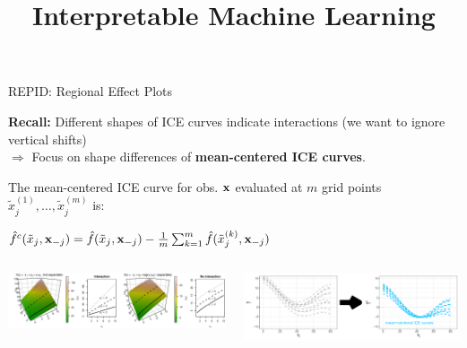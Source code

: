 \documentclass[11pt,compress,t,notes=noshow, aspectratio=169, xcolor=table]{beamer}
\title{Interpretable Machine Learning}
\date{}
\begin{document}
\newcommand{\titlefigure}{figure/ale_plot.pdf}
\newcommand{\learninggoals}{
\item Difference between feature effects and feature interactions
\item REPID
\item GADGET
}


\begin{frame}{REPID: Regional Effect Plots }

\textbf{Recall:} Different shapes of ICE curves indicate interactions (we want to ignore vertical shifts)\\
$\Rightarrow$ Focus on shape differences of {\color{cice}\bfseries mean-centered ICE curves}.
    

The mean-centered ICE curve for obs. $\mathbf{x}$ evaluated at $m$ grid points $\tilde x_j^{(1)}, \dots, \tilde x_j^{(m)}$ is:

{\color{cice}
\centerline{$\hat f^c(\tilde x_j, \mathbf{x}_{-j}) = \hat{f}(\tilde x_j, \mathbf{x}_{-j}) - \frac{1}{m} \sum\nolimits_{k=1}^m \hat{f}(\tilde x_j^{(k)}, \mathbf{x}_{-j})$}}

\begin{columns}
    \begin{column}{0.39\textwidth}
        \includegraphics[width = \textwidth, trim={13cm 0cm 0cm 0cm}, clip]{figure/interaction_separable_2}
    \end{column}
    \begin{column}{0.61\textwidth}
        \includegraphics[width = \textwidth]{figure/ice_rep_distance0.png} 
    \end{column}
\end{columns}

\end{frame}
\end{document}

